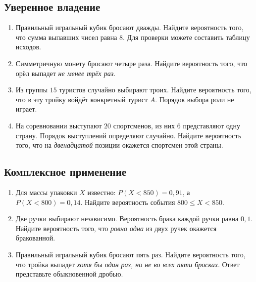 \documentclass[a4paper,12pt]{article}
\begin{document}
\subsection*{Уверенное владение}
\begin{enumerate}[label=\textcolor{darkaccent}{\bfseries \arabic*.},start=4,ref=\arabic*]
\item Правильный игральный кубик бросают дважды. Найдите вероятность того, что сумма выпавших чисел равна $8$. Для проверки можете составить таблицу исходов.
\item Симметричную монету бросают четыре раза. Найдите вероятность того, что орёл выпадет \emph{не менее трёх раз}.
\item Из группы $15$ туристов случайно выбирают троих. Найдите вероятность того, что в эту тройку войдёт конкретный турист $A$. Порядок выбора роли не играет.
\item На соревновании выступают $20$ спортсменов, из них $6$ представляют одну страну. Порядок выступлений определяют случайно. Найдите вероятность того, что на \emph{двенадцатой} позиции окажется спортсмен этой страны.
\end{enumerate}
\subsection*{Комплексное применение}
\begin{enumerate}[label=\textcolor{darkaccent}{\bfseries \arabic*.},start=8,ref=\arabic*]
\item Для массы упаковки $X$ известно: $P(X<850)=0{,}91$, а $P(X<800)=0{,}14$. Найдите вероятность события $800\le X<850$.
\item Две ручки выбирают независимо. Вероятность брака каждой ручки равна $0{,}1$. Найдите вероятность того, что \emph{ровно одна} из двух ручек окажется бракованной.
\item Правильный игральный кубик бросают пять раз. Найдите вероятность того, что тройка выпадет \emph{хотя бы один раз, но не во всех пяти бросках}. Ответ представьте обыкновенной дробью.
\end{enumerate}

\clearpage
\end{document}
